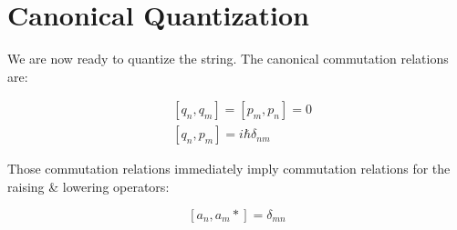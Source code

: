 \section{Canonical Quantization}

We are now ready to quantize the string.  The canonical commutation relations are:

\begin{align}
    & [q_n, q_m] = [p_m, p_n] = 0 \\
    & [q_n, p_m] = i \hbar \delta_{nm}
\end{align}


Those commutation relations immediately imply commutation relations for the raising & lowering operators:

\[
     [a_n, a_m *]= \delta_{mn}
     \]






